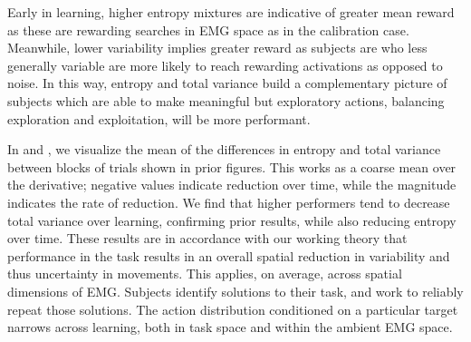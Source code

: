 \documentclass[../main.tex]{subfiles}
\begin{document}
Early in learning, higher entropy mixtures are indicative of greater mean reward as these are rewarding searches in EMG space as in the calibration case. Meanwhile, lower variability implies greater reward as subjects are who less generally variable are more likely to reach rewarding activations as opposed to noise. In this way, entropy and total variance build a complementary picture of subjects which are able to make meaningful but exploratory actions, balancing exploration and exploitation, will be more performant. 

In  and , we visualize the mean of the differences in entropy and total variance between blocks of trials shown in prior figures. This works as a coarse mean over the derivative; negative values indicate reduction over time, while the magnitude indicates the rate of reduction. We find that higher performers tend to decrease total variance over learning, confirming prior results, while also reducing entropy over time. These results are in accordance with our working theory that performance in the task results in an overall spatial reduction in variability and thus uncertainty in movements. This applies, on average, across spatial dimensions of EMG. Subjects identify solutions to their task, and work to reliably repeat those solutions. The action distribution conditioned on a particular target narrows across learning, both in task space and within the ambient EMG space.
\end{document}
